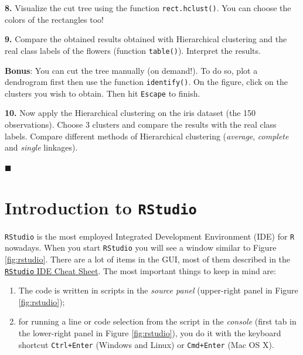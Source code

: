\documentclass[]{book}
\providecommand{\tightlist}{%
  \setlength{\itemsep}{0pt}\setlength{\parskip}{0pt}}
\theoremstyle{definition}
\theoremstyle{definition}
\theoremstyle{definition}
\theoremstyle{remark}
\begin{document}
\textbf{8.} Visualize the cut tree using the function
\texttt{rect.hclust()}. You can choose the colors of the rectangles too!

\textbf{9.} Compare the obtained results obtained with Hierarchical
clustering and the real class labels of the flowers (function
\texttt{table()}). Interpret the results.

\textbf{Bonus}: You can cut the tree manually (on demand!). To do so,
plot a dendrogram first then use the function \texttt{identify()}. On
the figure, click on the clusters you wish to obtain. Then hit
\texttt{Escape} to finish.

\textbf{10.} Now apply the Hierarchical clustering on the iris dataset
(the 150 observations). Choose 3 clusters and compare the results with
the real class labels. Compare different methods of Hierarchical
clustering (\emph{average}, \emph{complete} and \emph{single} linkages).

◼

\appendix {}


\chapter{\texorpdfstring{Introduction to
\texttt{RStudio}}{Introduction to RStudio}}\label{app-introRStudio}

\texttt{RStudio} is the most employed Integrated Development Environment
(IDE) for \texttt{R} nowadays. When you start \texttt{RStudio} you will
see a window similar to Figure \ref{fig:rstudio}. There are a lot of
items in the GUI, most of them described in the
\href{https://www.rstudio.com/wp-content/uploads/2016/01/rstudio-IDE-cheatsheet.pdf}{\texttt{RStudio}
IDE Cheat Sheet}. The most important things to keep in mind are:

\begin{enumerate}
\def\labelenumi{\arabic{enumi}.}
\tightlist
\item
  The code is written in scripts in the \emph{source panel} (upper-right
  panel in Figure \ref{fig:rstudio});
\item
  for running a line or code selection from the script in the
  \emph{console} (first tab in the lower-right panel in Figure
  \ref{fig:rstudio}), you do it with the keyboard shortcut
  \texttt{\textquotesingle{}Ctrl+Enter\textquotesingle{}} (Windows and
  Linux) or \texttt{\textquotesingle{}Cmd+Enter\textquotesingle{}} (Mac
  OS X).
\end{enumerate}
\end{document}
